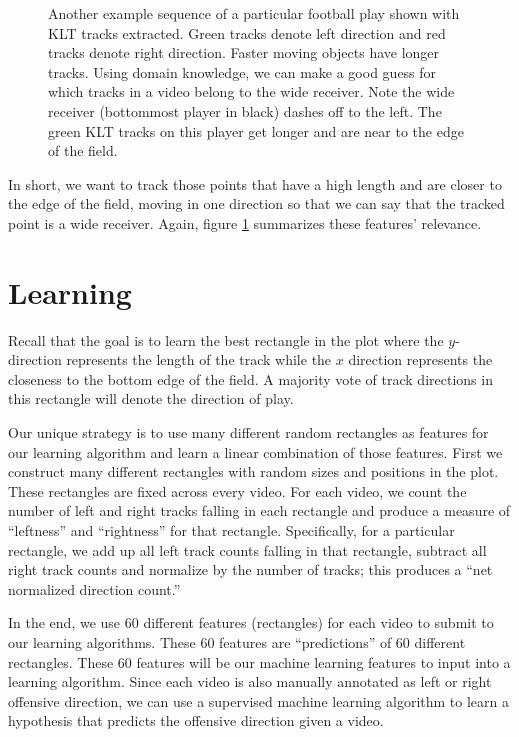 \documentclass{article} %
\begin{document}
\begin{figure}
\begin{subfigure}{.32\textwidth}
 \end{subfigure}\hspace{.5em}%
\caption{Another example sequence of a particular football play shown with KLT tracks extracted. Green tracks denote left direction and red tracks denote right direction. Faster moving objects have longer tracks. Using domain knowledge, we can make a good guess for which tracks in a video belong to the wide receiver. Note the wide receiver (bottommost player in black) dashes off to the left. The green KLT tracks on this player get longer and are near to the edge of the field.}
\label{fig:klt}
\end{figure}

In short, we want to track those points that have a high length and are closer to the edge of the field, moving in one direction so that we can say that the tracked point is a wide receiver. Again, figure \ref{fig:klt} summarizes these features' relevance.

\section{Learning}

Recall that the goal is to learn the best rectangle in the plot where the $y$-direction represents the length of the track while the $x$ direction represents the closeness to the bottom edge of the field. A majority vote of track directions in this rectangle will denote the direction of play.

Our unique strategy is to use many different random rectangles as features for our learning algorithm and learn a linear combination of those features. First we construct many different rectangles with random sizes and positions in the plot. These rectangles are fixed across every video. For each video, we count the number of left and right tracks falling in each rectangle and produce a measure of ``leftness'' and ``rightness'' for that rectangle. Specifically, for a particular rectangle, we add up all left track counts falling in that rectangle, subtract all right track counts and normalize by the number of tracks; this produces a ``net normalized direction count.''

In the end, we use 60 different features (rectangles) for each video to submit to our learning algorithms. These 60 features are ``predictions'' of 60 different rectangles. These 60 features will be our machine learning features to input into a learning algorithm. Since each video is also manually annotated as left or right offensive direction, we can use a supervised machine learning algorithm to learn a hypothesis that predicts the offensive direction given a video.
\end{document}
